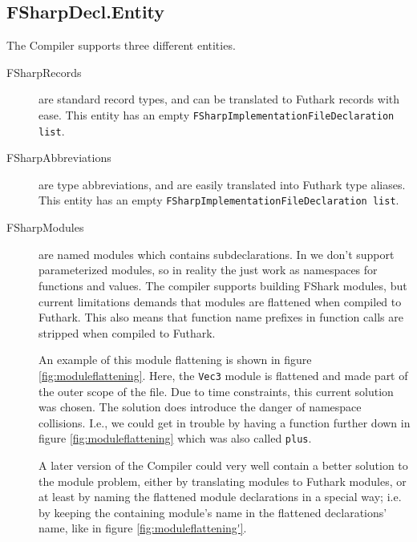 \subsection{FSharpDecl.Entity}
The \fshark{}Compiler supports three different entities.
\begin{description}
\item[FSharpRecords] are standard record types, and can be translated to
  Futhark records with ease.
  This entity has an empty \texttt{FSharpImplementationFileDeclaration list}.
\item[FSharpAbbreviations] are type abbreviations, and are easily translated
  into Futhark type aliases.
  This entity has an empty \texttt{FSharpImplementationFileDeclaration list}.
\item[FSharpModules] are named modules which contains subdeclarations. In
  \fshark{} we don't support parameterized modules, so in reality the just work
  as namespaces for functions and values.
  The \fshark{} compiler supports building FShark modules, but current
  limitations demands that modules are flattened when compiled to Futhark.
  This also means that function name prefixes in function calls are stripped
  when compiled to Futhark.

  An example of this module flattening is shown in
  figure \ref{fig:moduleflattening}. Here, the \texttt{Vec3} module is flattened
  and made part of the outer scope of the file. 
  Due to time constraints, this current solution was chosen.
  The solution does introduce the danger of namespace collisions. I.e.,
  we could get in trouble by having a function further down in figure
  \ref{fig:moduleflattening} which was also called \texttt{plus}.

  A later version of the \fshark{}Compiler could very well contain a better
  solution to the module problem, either by translating \fshark{} modules to
  Futhark modules, or at least by naming the flattened module declarations in a
  special way; i.e. by keeping the containing module's name in the flattened
  declarations' name, like in figure \ref{fig:moduleflattening'}.
\end{description}

